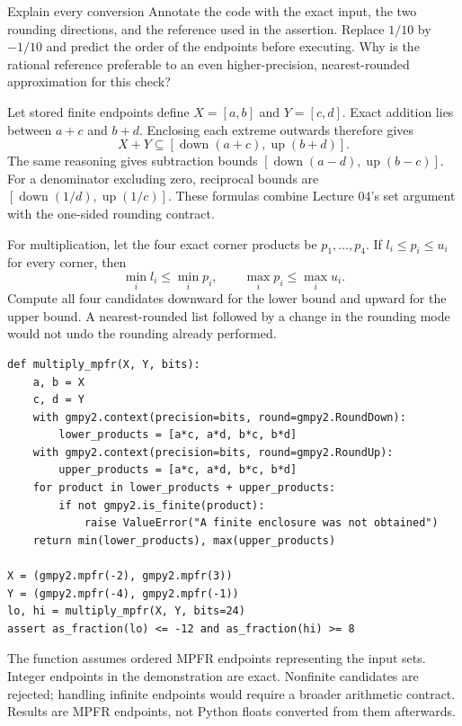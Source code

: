 \begin{question}{Explain every conversion}
Annotate the code with the exact input, the two rounding directions, and the
reference used in the assertion. Replace $1/10$ by $-1/10$ and predict the order
of the endpoints before executing. Why is the rational reference preferable to
an even higher-precision, nearest-rounded approximation for this check?
\end{question}

\newpage
{}
Let stored finite endpoints define $X=[a,b]$ and $Y=[c,d]$. Exact addition lies
between $a+c$ and $b+d$. Enclosing each extreme outwards therefore gives
\[
 X+Y\subseteq[\operatorname{down}(a+c),\operatorname{up}(b+d)].
\]
The same reasoning gives subtraction bounds
$[\operatorname{down}(a-d),\operatorname{up}(b-c)]$. For a denominator excluding
zero, reciprocal bounds are $[\operatorname{down}(1/d),\operatorname{up}(1/c)]$.
These formulas combine Lecture 04's set argument with the one-sided rounding contract.

For multiplication, let the four exact corner products be $p_1,\ldots,p_4$.
If $l_i\le p_i\le u_i$ for every corner, then
\[
 \min_i l_i\le\min_i p_i,\qquad \max_i p_i\le\max_i u_i.
\]
Compute all four candidates downward for the lower bound and upward for the
upper bound. A nearest-rounded list followed by a change in the rounding mode
would not undo the rounding already performed.
\begin{lstlisting}
def multiply_mpfr(X, Y, bits):
    a, b = X
    c, d = Y
    with gmpy2.context(precision=bits, round=gmpy2.RoundDown):
        lower_products = [a*c, a*d, b*c, b*d]
    with gmpy2.context(precision=bits, round=gmpy2.RoundUp):
        upper_products = [a*c, a*d, b*c, b*d]
    for product in lower_products + upper_products:
        if not gmpy2.is_finite(product):
            raise ValueError("A finite enclosure was not obtained")
    return min(lower_products), max(upper_products)

X = (gmpy2.mpfr(-2), gmpy2.mpfr(3))
Y = (gmpy2.mpfr(-4), gmpy2.mpfr(-1))
lo, hi = multiply_mpfr(X, Y, bits=24)
assert as_fraction(lo) <= -12 and as_fraction(hi) >= 8
\end{lstlisting}
The function assumes ordered MPFR endpoints representing the input sets. Integer
endpoints in the demonstration are exact. Nonfinite candidates are rejected;
handling infinite endpoints would require a broader arithmetic contract.
Results are MPFR endpoints, not Python floats converted from them afterwards.


